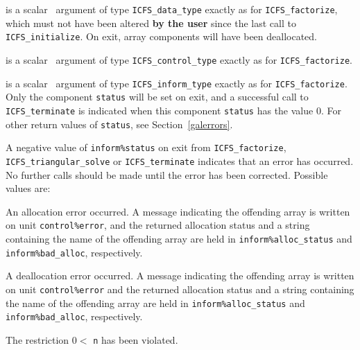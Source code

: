 \documentclass{galahad}
\newcommand{\packagename}{ICFS}
\begin{document}
\vspace*{-1mm}
\begin{description}

 is a scalar \intentinout\ argument of type 
{\tt \packagename\_data\_type} 
exactly as for
{\tt \packagename\_factorize},
which must not have been altered {\bf by the user} since the last call to 
{\tt \packagename\_initialize}.
On exit, array components will have been deallocated.

 is a scalar \intentin\ argument of type 
{\tt \packagename\_control\_type}
exactly as for
{\tt \packagename\_factorize}.

 is a scalar \intentout\ argument of type
{\tt \packagename\_inform\_type}
exactly as for
{\tt \packagename\_factorize}.
Only the component {\tt status} will be set on exit, and a 
successful call to 
{\tt \packagename\_terminate}
is indicated when this  component {\tt status} has the value 0. 
For other return values of {\tt status}, see Section~\ref{galerrors}.

\end{description}


\galerrors
A negative value of {\tt inform\%status} on exit from 
{\tt \packagename\_factorize},
{\tt \packagename\_triangular\_solve}
or 
{\tt \packagename\_terminate}
indicates that an error has occurred. No further calls should be made
until the error has been corrected. Possible values are:

\begin{description}

 An allocation error occurred. 
A message indicating the offending
array is written on unit {\tt control\%error}, and the returned allocation 
status and a string containing the name of the offending array
are held in {\tt inform\%alloc\_\-status}
and {\tt inform\%bad\_alloc}, respectively.

 A deallocation error occurred. 
A message indicating the offending 
array is written on unit {\tt control\%error} and the returned allocation 
status and a string containing the name of the offending array
are held in {\tt inform\%alloc\_\-status}
and {\tt inform\%bad\_alloc}, respectively.

The restriction 
$0 <$ {\tt n} 
 has been violated.

\end{description}
\end{document}

